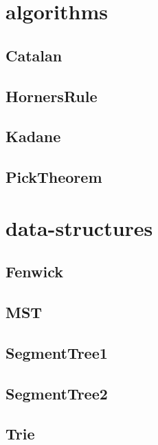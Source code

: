\section{algorithms}
\subsection{ Catalan}
\raggedbottom
\hrulefill
\subsection{ HornersRule}
\raggedbottom
\hrulefill
\subsection{ Kadane}
\raggedbottom
\hrulefill
\subsection{ PickTheorem}
\raggedbottom
\hrulefill

\section{data-structures}
\subsection{ Fenwick}
\raggedbottom
\hrulefill
\subsection{ MST}
\raggedbottom
\hrulefill
\subsection{ SegmentTree1}
\raggedbottom
\hrulefill
\subsection{ SegmentTree2}
\raggedbottom
\hrulefill
\subsection{ Trie}
\raggedbottom
\hrulefill

